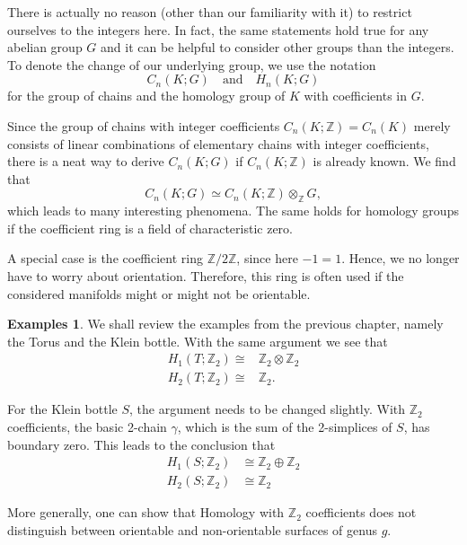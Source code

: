 \documentclass[toc=bib, headinclude]{scrartcl}
\theoremstyle{plain}
\theoremstyle{definition}
\newtheorem{examples}[theorem]{Examples}
\theoremstyle{remark}
\newcommand{\isom}{\cong}
\newcommand{\Z}{\mathbb{Z}}
\newcommand{\qandq}{\quad \text{and} \quad}
\begin{document}
There is actually no reason (other than our familiarity with it) to restrict ourselves to the integers here. In fact, the same statements hold true for any abelian group $G$ and it can be helpful to consider other groups than the integers. To denote the change of our underlying group, we use the notation
\[
C_n(K;G)\qandq H_n(K;G)
\]
for the group of chains and the homology group of $K$ with coefficients in $G$.

Since the group of chains with integer coefficients $C_n(K;\Z)=C_n(K)$ merely consists of linear combinations of elementary chains with integer coefficients, there is a neat way to derive $C_n(K;G)$ if $C_n(K;\Z)$ is already known. We find that
\[
C_n(K;G)\simeq C_n(K;\Z)\otimes_\Z G,
\]
which leads to many interesting phenomena. The same holds for homology groups if the coefficient ring is a field of characteristic zero.





A special case is the coefficient ring $\Z/2\Z$, since here $-1=1$. Hence, we no longer have to worry about orientation. Therefore, this ring is often used if the considered manifolds might or might not be orientable.


\begin{examples}
	We shall review the examples from the previous chapter, namely the Torus and the Klein bottle. With the same argument we see that
	\begin{align*}
		H_1(T;\Z_2)\isom& \Z_2\otimes\Z_2\\
		H_2(T;\Z_2)\isom& \Z_2.
	\end{align*}
	
	For the Klein bottle $S$, the argument needs to be changed slightly. With $\Z_2$ coefficients, the basic 2-chain $\gamma$, which is the sum of the 2-simplices of $S$, has boundary zero. This leads to the conclusion that 
	\begin{align*}
		H_1(S;\Z_2)&\isom \Z_2\oplus \Z_2\\
		H_2(S;\Z_2)&\isom \Z_2
	\end{align*}

	More generally, one can show that Homology with $\Z_2$ coefficients does not distinguish between orientable and non-orientable surfaces of genus $g$.
\end{examples}
\end{document}
